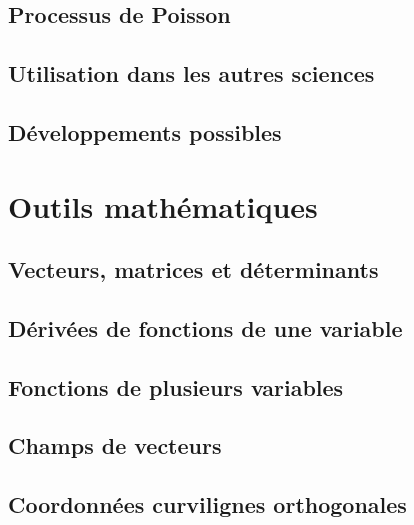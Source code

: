 \chapter{Processus de Poisson}


\chapter{Utilisation dans les autres sciences}



\chapter{Développements possibles}



 
\part{Outils mathématiques} 

\chapter{Vecteurs, matrices et déterminants}
    

\chapter{Dérivées de fonctions de une variable}


\chapter{Fonctions de plusieurs variables}


\chapter{Champs de vecteurs}


\chapter{Coordonnées curvilignes orthogonales}


